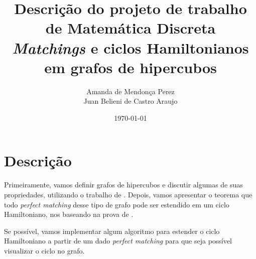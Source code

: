 \documentclass[11pt]{article}
\title{
	Descrição do projeto de trabalho de Matemática Discreta \\ \vspace{0.2cm}
	\large \textit{Matchings} e ciclos Hamiltonianos em grafos de hipercubos
}
\author{
	Amanda de Mendonça Perez \\
	Juan Belieni de Castro Araujo
}
\date{\today}
\begin{document}
	
\maketitle

\section{Descrição}

Primeiramente, vamos definir grafos de hipercubos e discutir algumas de suas propriedades, utilizando o trabalho de \citeauthor{harary_survey_1988}. Depois, vamos apresentar o teorema que todo \textit{perfect matching} desse tipo de grafo pode ser estendido em um ciclo Hamiltoniano, nos baseando na prova de \citeauthor{fink_perfect_2007}.

Se possível, vamos implementar algum algoritmo para estender o ciclo Hamiltoniano a partir de um dado \textit{perfect matching} para que seja possível visualizar o ciclo no grafo.

\printbibliography
\end{document}
